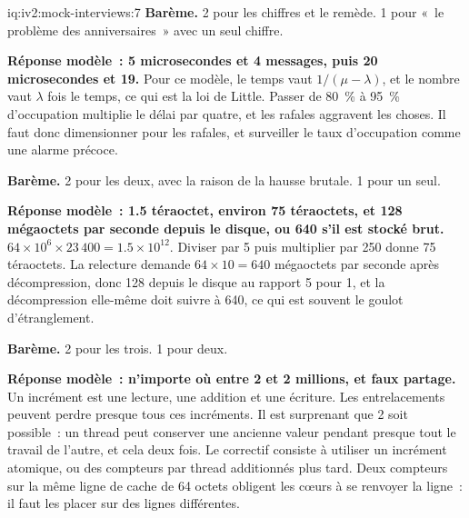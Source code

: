 \begin{solution}{iq:iv2:mock-interviews:7}
\textbf{Barème.} 2 pour les chiffres et le remède. 1 pour «~le problème des anniversaires~» avec un seul chiffre.

\ivstop
\textbf{Réponse modèle~: 5 microsecondes et 4 messages, puis 20 microsecondes et 19.} Pour ce modèle, le temps vaut $1/(\mu - \lambda)$, et le nombre vaut $\lambda$ fois le temps, ce qui est la loi de Little. Passer de 80~\% à 95~\% d'occupation multiplie le délai par quatre, et les rafales aggravent les choses. Il faut donc dimensionner pour les rafales, et surveiller le taux d'occupation comme une alarme précoce.

\textbf{Barème.} 2 pour les deux, avec la raison de la hausse brutale. 1 pour un seul.

\ivstop
\textbf{Réponse modèle~: 1.5 téraoctet, environ 75 téraoctets, et 128 mégaoctets par seconde depuis le disque, ou 640 s'il est stocké brut.} $64 \times 10^6 \times 23\,400 = 1.5 \times 10^{12}$. Diviser par 5 puis multiplier par 250 donne 75 téraoctets. La relecture demande $64 \times 10 = 640$ mégaoctets par seconde après décompression, donc 128 depuis le disque au rapport 5 pour 1, et la décompression elle-même doit suivre à 640, ce qui est souvent le goulot d'étranglement.

\textbf{Barème.} 2 pour les trois. 1 pour deux.

\ivstop
\textbf{Réponse modèle~: n'importe où entre 2 et 2 millions, et faux partage.} Un incrément est une lecture, une addition et une écriture. Les entrelacements peuvent perdre presque tous ces incréments. Il est surprenant que 2 soit possible~: un thread peut conserver une ancienne valeur pendant presque tout le travail de l'autre, et cela deux fois. Le correctif consiste à utiliser un incrément atomique, ou des compteurs par thread additionnés plus tard. Deux compteurs sur la même ligne de cache de 64 octets obligent les cœurs à se renvoyer la ligne~: il faut les placer sur des lignes différentes.


\end{solution}
